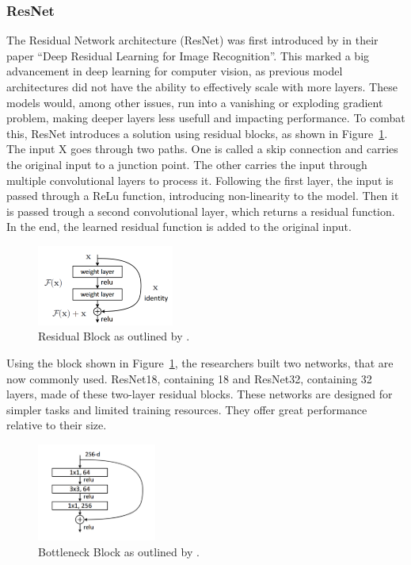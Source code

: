 \subsubsection{ResNet}\label{resnet}
The Residual Network architecture (ResNet) was first introduced by \citep{he2015deep} in their paper ``Deep Residual Learning for Image Recognition''. This marked a big advancement in deep learning for computer vision, as previous model architectures did not have the ability to effectively scale with more layers. These models would, among other issues, run into a vanishing or exploding gradient problem, making deeper layers less usefull and impacting performance. To combat this, ResNet introduces a solution using residual blocks, as shown in Figure~\ref{fig:residualBlock}. The input X goes through two paths. One is called a skip connection and carries the original input to a junction point. The other carries the input through multiple convolutional layers to process it. Following the first layer, the input is passed through a ReLu function, introducing non-linearity to the model. Then it is passed trough a second convolutional layer, which returns a residual function. In the end, the learned residual function is added to the original input.

\begin{figure}[ht]
    \centering
    \includegraphics[width=0.4\textwidth]{figures/ResidualBlock.png}
    \caption{Residual Block as outlined by \citeauthor{he2015deep}.}\label{fig:residualBlock}
\end{figure}

\label{resnet18}
Using the block shown in Figure~\ref{fig:residualBlock}, the researchers built two networks, that are now commonly used. ResNet18, containing 18 and ResNet32, containing 32 layers, made of these two-layer residual blocks. These networks are designed for simpler tasks and limited training resources. They offer great performance relative to their size.

\begin{figure}[ht]
    \centering
    \includegraphics[width=0.35\textwidth]{figures/BottleNeckBlock.png}
    \caption{Bottleneck Block as outlined by \citeauthor{he2015deep}.}\label{fig:bottleneckBlock}
\end{figure}

